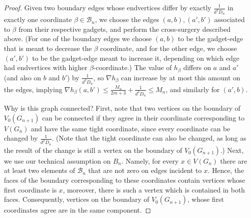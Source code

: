 \documentclass[10pt,a4paper]{amsart}
\begin{document}
\begin{proof}
Given two boundary edges whose endvertices differ by exactly $\frac{1}{d^2D_n}$ in exactly one coordinate $\beta \in \mathcal{B}_n$, we choose the edges $(a,b), (a',b')$ associated to $\beta$ from their respective gadgets, and perform the cross-surgery described above. (For one of the boundary edges we choose $(a,b)$ to be the gadget-edge that is meant to decrease the $\beta$ coordinate, and for the other edge, we choose $(a',b')$ to be the gadget-edge meant to increase it, depending on which edge had endvertices with higher $\beta$-coordinate.) The value of $h_{\beta}$ differs on $a$ and $a'$ (and also on $b$ and $b'$) by $\frac{1}{d^2D_n}$, so $\nabla h_{\beta}$ can increase by at most this amount on the edges, implying $\nabla h_{\beta} (a,b') \leq \frac{M_n}{2m+3} + \frac{1}{d^2D_n} \leq M_n$, and similarly for $(a',b)$.

Why is this graph connected? First, note that two vertices on the boundary of $V_0(G_{n+1})$ can be connected if they agree in their coordinate corresponding to $V(G_n)$ and have the same tight coordinate, since every coordinate can be changed by $\frac{1}{d^2D_n}$. (Note that the tight coordinate can also be changed, as long as the result of the change is still a vertex on the boundary of $V_0(G_{n+1})$.) Next, we use our technical assumption on $B_n$. Namely, for every $x \in V(G_n)$ there are at least two elements of $\mathcal{B}_n$ that are not zero on edges incident to $x$. Hence, the faces of the boundary corresponding to these coordinates contain vertices whose first coordinate is $x$, moreover, there is such a vertex which is contained in both faces. Consequently, vertices on the boundary of $V_0(G_{n+1})$, whose first coordinates agree are in the same component. 


\end{proof}
\end{document}
